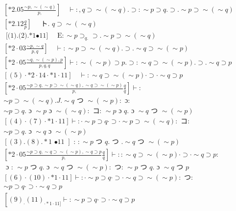 \documentclass[10pt]{article}
\begin{document}
\begin{align*}
& {\left[* 2.05 \frac{\sim p, \sim(\sim q)}{p,}\right] \quad \vdash:, q \supset \sim(\sim q) . \supset: \sim p \supset q . \supset . \sim p \supset \sim(\sim q)}  \tag{1}\\
& {\left[* 2.12 \frac{q}{p}\right] \quad \text { ト. } q \supset \sim(\sim q)}  \tag{2}\\
& \text { [(1).(2).*1•11] } \quad \mathrm{E}: \sim p \supset_{q .} \supset . \sim p \supset \sim(\sim q)  \tag{3}\\
& {\left[* 2 \cdot 03 \frac{\sim p, \sim q}{p, q}\right] \quad \vdash: \sim p \supset \sim(\sim q) . \supset . \sim q \supset \sim(\sim p)}  \tag{4}\\
& {\left[* 2 \cdot 05 \frac{\sim q, \sim(\sim p), p}{p, q, q}\right] \vdash: \sim(\sim p) \supset p . \supset: \sim q \supset \sim(\sim p) . \supset . \sim q \supset p}  \tag{5}\\
& {[(5) \cdot * 2 \cdot 14 \cdot * 1 \cdot 11] \quad \vdash: \sim q \supset \sim(\sim p) \cdot \supset \cdot \sim q \supset p}  \tag{6}\\
& {\left[* 2 \cdot 05 \frac{\sim p \supset q, \sim p \supset \sim(\sim q), \sim q \supset \sim(\sim p)}{p,} \frac{q}{q}\right] \vdash:} \\
& \sim p \supset \sim(\sim q) . J . \sim q \text { つ } \sim(\sim p): \text { ɔ: } \\
& \sim p \supset q . \text { ɔ } \sim p \text { ɔ } \sim(\sim q): \text { コ: } \sim p \text { ɔ } q . \text { ɔ } \sim q \text { つ } \sim(\sim p)  \tag{7}\\
& {[(4) \cdot(7) \cdot * 1 \cdot 11] \vdash: \cdot \sim p \supset q \cdot \supset \cdot \sim p \supset \sim(\sim q): \text { コ: }} \\
& \sim p \supset q . \text { ɔ } \sim q \text { ɔ } \sim(\sim p)  \tag{8}\\
& {[(3) .(8) . * 1 \text { •11 }] \text { : }: \sim p \text { つ } q . \text { つ } . \sim q \text { つ } \sim(\sim p)}  \tag{9}\\
& {\left[* 2 \cdot 05 \frac{\sim p \supset q, \sim q \supset \sim(\sim p), \sim q \supset p}{p,} \frac{q}{q}\right] \vdash:: \sim q \supset \sim(\sim p) \cdot \supset \cdot \sim q \supset p:} \\
& \text { ɔ : } \sim p \text { つ } q . \text { ɔ } \sim q \text { つ } \sim(\sim p): \text { つ: } \sim p \text { つ } q . \text { ɔ } \sim q \text { つ } p  \tag{10}\\
& {[(6) \cdot(10) \cdot * 1 \cdot 11] \vdash: \cdot \sim p \supset q \cdot \supset \cdot \sim q \supset \sim(\sim p): \text { つ: }} \\
& \sim p \supset q \cdot \supset \cdot \sim q \supset p  \tag{11}\\
& {\left[(9)_{\cdot}(11)_{\cdot * 1 \cdot 11]} \vdash: \sim p \supset q \cdot \supset \cdot \sim q \supset p\right.}
\end{align*}
\end{document}
